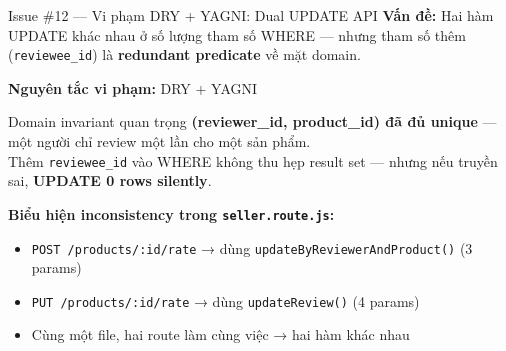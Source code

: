 \documentclass[12pt]{beamer}
\begin{document}
\begin{frame}{Issue \#12 — Vi phạm DRY + YAGNI: Dual UPDATE API}
  \textbf{Vấn đề:} Hai hàm UPDATE khác nhau ở số lượng tham số WHERE — nhưng tham số thêm (\texttt{reviewee\_id}) là \textbf{redundant predicate} về mặt domain.

  \bigskip
  \textbf{Nguyên tắc vi phạm:} \alert{DRY} + \alert{YAGNI}

  \bigskip
  \begin{alertblock}{Domain invariant quan trọng}
    \textbf{(reviewer\_id, product\_id) đã đủ unique} — một người chỉ review một lần cho một sản phẩm.\\
    Thêm \texttt{reviewee\_id} vào WHERE không thu hẹp result set — nhưng nếu truyền sai, \textbf{UPDATE 0 rows silently}.
  \end{alertblock}

  \bigskip
  \textbf{Biểu hiện inconsistency trong \texttt{seller.route.js}:}
  \begin{itemize}
    \item \texttt{POST /products/:id/rate} → dùng \texttt{updateByReviewerAndProduct()} (3 params)
    \item \texttt{PUT /products/:id/rate} → dùng \texttt{updateReview()} (4 params)
    \item Cùng một file, hai route làm cùng việc → hai hàm khác nhau
  \end{itemize}
\end{frame}
\end{document}
